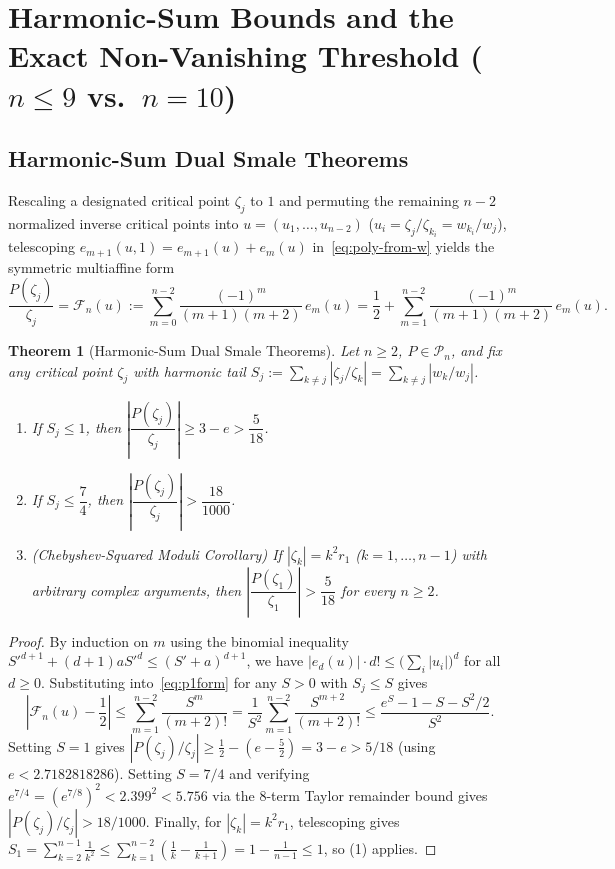 \documentclass[11pt,a4paper]{article}
\newtheorem{theorem}{Theorem}[section]
\theoremstyle{definition}
\theoremstyle{remark}
\begin{document}
\section{Harmonic-Sum Bounds and the Exact Non-Vanishing Threshold ($n \le 9$ vs.\ $n = 10$)}
\label{sec:harmonic-threshold}

\subsection{Harmonic-Sum Dual Smale Theorems}

Rescaling a designated critical point $\zeta_j$ to $1$ and permuting the remaining $n - 2$ normalized inverse critical points into $u = (u_1, \dots, u_{n-2})$ ($u_i = \zeta_j / \zeta_{k_i} = w_{k_i} / w_j$), telescoping $e_{m+1}(u, 1) = e_{m+1}(u) + e_m(u)$ in~\eqref{eq:poly-from-w} yields the symmetric multiaffine form~\cite{BesevicAllN}
\begin{equation}
\label{eq:p1form}
\frac{P(\zeta_j)}{\zeta_j} = \mathcal{F}_n(u) := \sum_{m=0}^{n-2} \frac{(-1)^m}{(m + 1)(m + 2)}\, e_m(u) = \frac{1}{2} + \sum_{m=1}^{n-2} \frac{(-1)^m}{(m + 1)(m + 2)}\, e_m(u).
\end{equation}

\begin{theorem}[Harmonic-Sum Dual Smale Theorems]
\label{thm:harmonic-sum}
Let $n \ge 2$, $P \in \mathcal{P}_n$, and fix any critical point $\zeta_j$ with harmonic tail $S_j := \sum_{k \neq j} |\zeta_j / \zeta_k| = \sum_{k \neq j} |w_k / w_j|$.
\begin{enumerate}
\item If $S_j \le 1$, then $\left|\dfrac{P(\zeta_j)}{\zeta_j}\right| \ge 3 - e > \dfrac{5}{18}$.
\item If $S_j \le \dfrac{7}{4}$, then $\left|\dfrac{P(\zeta_j)}{\zeta_j}\right| > \dfrac{18}{1000}$.
\item \emph{(Chebyshev-Squared Moduli Corollary)} If $|\zeta_k| = k^2 r_1$ ($k = 1, \dots, n - 1$) with arbitrary complex arguments, then $\left|\dfrac{P(\zeta_1)}{\zeta_1}\right| > \dfrac{5}{18}$ for every $n \ge 2$.
\end{enumerate}
\end{theorem}

\begin{proof}
By induction on $m$ using the binomial inequality $S'^{d+1} + (d + 1) a S'^d \le (S' + a)^{d+1}$, we have $|e_d(u)| \cdot d! \le \bigl(\sum_i |u_i|\bigr)^d$ for all $d \ge 0$. Substituting into~\eqref{eq:p1form} for any $S > 0$ with $S_j \le S$ gives
\[
\left|\mathcal{F}_n(u) - \frac{1}{2}\right| \le \sum_{m=1}^{n-2} \frac{S^m}{(m + 2)!} = \frac{1}{S^2} \sum_{m=1}^{n-2} \frac{S^{m+2}}{(m + 2)!} \le \frac{e^S - 1 - S - S^2/2}{S^2}.
\]
Setting $S = 1$ gives $|P(\zeta_j)/\zeta_j| \ge \frac{1}{2} - (e - \frac{5}{2}) = 3 - e > 5/18$ (using $e < 2.7182818286$). Setting $S = 7/4$ and verifying $e^{7/4} = (e^{7/8})^2 < 2.399^2 < 5.756$ via the 8-term Taylor remainder bound gives $|P(\zeta_j)/\zeta_j| > 18/1000$. Finally, for $|\zeta_k| = k^2 r_1$, telescoping gives $S_1 = \sum_{k=2}^{n-1} \frac{1}{k^2} \le \sum_{k=1}^{n-2} (\frac{1}{k} - \frac{1}{k+1}) = 1 - \frac{1}{n-1} \le 1$, so (1) applies.
\end{proof}
\end{document}
